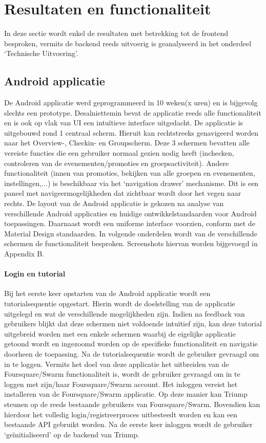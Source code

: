 
\chapter{Resultaten en functionaliteit}
In deze sectie wordt enkel de resultaten met betrekking tot de frontend besproken, vermits de backend reeds uitvoerig is geanalyseerd in het onderdeel `Technische Uitvoering'.
\section{Android applicatie}
De Android applicatie werd geprogrammeerd in 10 weken(x uren) en is bijgevolg slechts een prototype. Desalniettemin bevat de applicatie reeds alle functionaliteit en is ook op vlak van UI een intuïtieve interface uitgedacht.
De applicatie is uitgebouwd rond 1 centraal scherm. Hieruit kan rechtstreeks genavigeerd worden naar het Overview-, Checkin- en Groupscherm. Deze 3 schermen bevatten alle vereiste functies die een gebruiker normaal gezien nodig heeft (inchecken, controleren van de evenementen/promoties en groepsactiviteit). Andere functionaliteit (innen van promoties, bekijken van alle groepen en evenementen, instellingen,...) is beschikbaar via het `navigation drawer' mechanisme. Dit is een paneel met navigeermogelijkheden dat zichtbaar wordt door het vegen naar rechts. De layout van de Android applicatie is gekozen na analyse van verschillende Android applicaties en huidige ontwikkelstandaarden voor Android toepassingen. Daarnaast wordt een uniforme interface voorzien, conform met de Material Design standaarden. In volgende onderdelen wordt van de verschillende schermen de functionaliteit besproken. Screenshots hiervan worden bijgevoegd in Appendix B.
\subsubsection{Login en tutorial} %
Bij het eerste keer opstarten van de Android applicatie wordt een tutorialsequentie opgestart. Hierin wordt de doelstelling van de applicatie uitgelegd en wat de verschillende mogelijkheden zijn. Indien na feedback van gebruikers blijkt dat deze schermen niet voldoende intuïtief zijn, kan deze tutorial uitgebreid worden met een enkele schermen waarbij de eigelijke applicatie getoond wordt en ingezoomd worden op de specifieke functionaliteit en navigatie doorheen de toepassing. 
Na de tutorialsequentie wordt de gebruiker gevraagd om in te loggen. Vermits het doel van deze applicatie het uitbreiden van de Foursquare/Swarm functionaliteit is, wordt de gebruiker gevraagd om in te loggen met zijn/haar Foursquare/Swarm account. Het inloggen vereist het installeren van de Foursquare/Swarm applicatie. Op deze manier kan Triump steunen op de reeds bestaande gebruikers van Foursquare/Swarm. Bovendien kan hierdoor het volledig login/registreerproces uitbesteedt worden en kan een bestaande API gebruikt worden.
Na de eerste keer inloggen wordt de gebruiker `geïnitialiseerd' op de backend van Triump.
